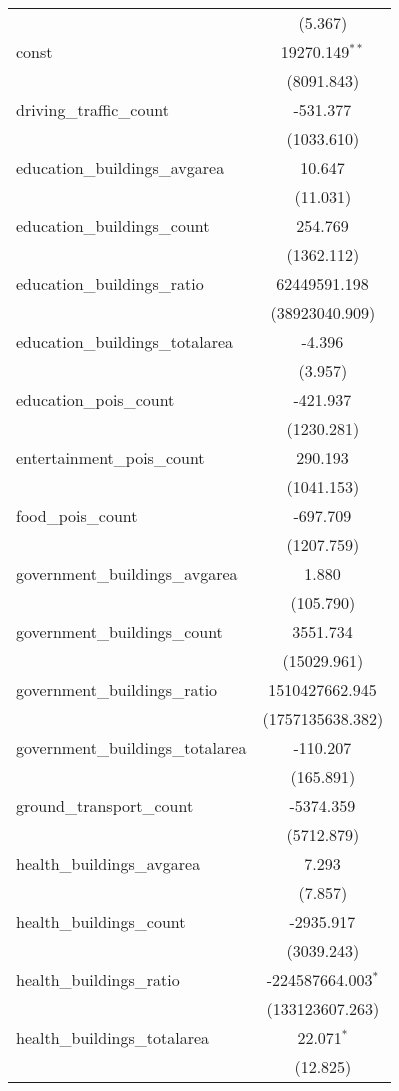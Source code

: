 \begin{table}[!htbp]
\begin{tabular}{@{\extracolsep{5pt}}lc}
  & (5.367) \\
 const & 19270.149$^{**}$ \\
  & (8091.843) \\
 driving_traffic_count & -531.377$^{}$ \\
  & (1033.610) \\
 education_buildings_avgarea & 10.647$^{}$ \\
  & (11.031) \\
 education_buildings_count & 254.769$^{}$ \\
  & (1362.112) \\
 education_buildings_ratio & 62449591.198$^{}$ \\
  & (38923040.909) \\
 education_buildings_totalarea & -4.396$^{}$ \\
  & (3.957) \\
 education_pois_count & -421.937$^{}$ \\
  & (1230.281) \\
 entertainment_pois_count & 290.193$^{}$ \\
  & (1041.153) \\
 food_pois_count & -697.709$^{}$ \\
  & (1207.759) \\
 government_buildings_avgarea & 1.880$^{}$ \\
  & (105.790) \\
 government_buildings_count & 3551.734$^{}$ \\
  & (15029.961) \\
 government_buildings_ratio & 1510427662.945$^{}$ \\
  & (1757135638.382) \\
 government_buildings_totalarea & -110.207$^{}$ \\
  & (165.891) \\
 ground_transport_count & -5374.359$^{}$ \\
  & (5712.879) \\
 health_buildings_avgarea & 7.293$^{}$ \\
  & (7.857) \\
 health_buildings_count & -2935.917$^{}$ \\
  & (3039.243) \\
 health_buildings_ratio & -224587664.003$^{*}$ \\
  & (133123607.263) \\
 health_buildings_totalarea & 22.071$^{*}$ \\
  & (12.825) \\

\end{tabular}
\end{table}
